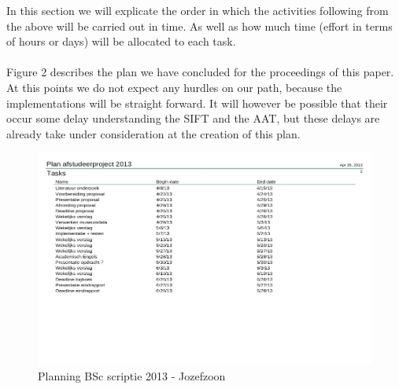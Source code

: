 \documentclass[12pt ,twocolumn]{article}
\begin{document}
In this section we will explicate the order in which the activities following from the above will be carried out in time. As well as how much time (effort in terms of hours or days) will be allocated to each task. \\\\ Figure 2 describes the plan we have concluded for the proceedings of this paper. At this points we do not expect any hurdles on our path, because the implementations will be straight forward. It will however be possible that their occur some delay understanding the SIFT and the AAT, but these delays are already take under consideration at the creation of this plan.
\begin{figure}

\includegraphics[scale=0.80]{plan.png}

\captionsetup{font=scriptsize}
\caption{Planning BSc scriptie 2013 - Jozefzoon} 
\end{figure}
\newpage

\end{document}
